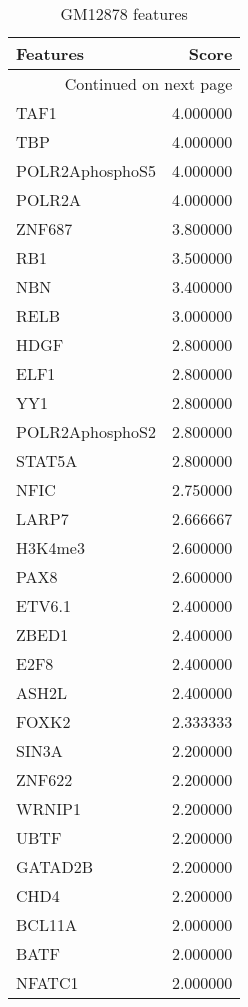 \begin{longtable}{lr}
\caption{GM12878 features}\\
\toprule
        Features &     Score \\
\midrule
\endhead
\midrule
\multicolumn{2}{r}{{Continued on next page}} \\
\midrule
\endfoot

\bottomrule
\endlastfoot
            TAF1 &  4.000000 \\
             TBP &  4.000000 \\
 POLR2AphosphoS5 &  4.000000 \\
          POLR2A &  4.000000 \\
          ZNF687 &  3.800000 \\
             RB1 &  3.500000 \\
             NBN &  3.400000 \\
            RELB &  3.000000 \\
            HDGF &  2.800000 \\
            ELF1 &  2.800000 \\
             YY1 &  2.800000 \\
 POLR2AphosphoS2 &  2.800000 \\
          STAT5A &  2.800000 \\
            NFIC &  2.750000 \\
           LARP7 &  2.666667 \\
         H3K4me3 &  2.600000 \\
            PAX8 &  2.600000 \\
          ETV6.1 &  2.400000 \\
           ZBED1 &  2.400000 \\
            E2F8 &  2.400000 \\
           ASH2L &  2.400000 \\
           FOXK2 &  2.333333 \\
           SIN3A &  2.200000 \\
          ZNF622 &  2.200000 \\
          WRNIP1 &  2.200000 \\
            UBTF &  2.200000 \\
         GATAD2B &  2.200000 \\
            CHD4 &  2.200000 \\
          BCL11A &  2.000000 \\
            BATF &  2.000000 \\
          NFATC1 &  2.000000 \\

\end{longtable}
